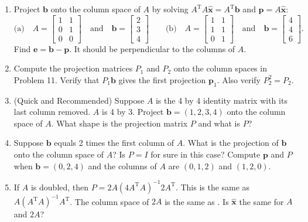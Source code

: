 \documentclass[14pt, a4paper]{article}
\begin{document}
\begin{enumerate}[resume]
    \item Project $\boldsymbol{b}$ onto the column space of $A$ by solving $A^{\mathrm{T}}A\widehat{\boldsymbol{x}} = A^{\mathrm{T}}\boldsymbol{b}$ and $\boldsymbol{p} = A\widehat{\boldsymbol{x}}$:
          \[
              \text{(a)} \quad A = \begin{bmatrix} 1 & 1 \\ 0 & 1 \\ 0 & 0 \end{bmatrix} \quad \text{and} \quad \boldsymbol{b} = \begin{bmatrix} 2 \\ 3 \\ 4 \end{bmatrix} \qquad
              \text{(b)} \quad A = \begin{bmatrix} 1 & 1 \\ 1 & 1 \\ 0 & 1 \end{bmatrix} \quad \text{and} \quad \boldsymbol{b} = \begin{bmatrix} 4 \\ 4 \\ 6 \end{bmatrix}.
          \]
          Find $\boldsymbol{e} = \boldsymbol{b} - \boldsymbol{p}$. It should be perpendicular to the columns of $A$.

    \item Compute the projection matrices $P_1$ and $P_2$ onto the column spaces in Problem 11. Verify that $P_1\boldsymbol{b}$ gives the first projection $\boldsymbol{p}_1$. Also verify $P_2^2 = P_2$.

    \item (Quick and Recommended) Suppose $A$ is the 4 by 4 identity matrix with its last column removed. $A$ is 4 by 3. Project $\boldsymbol{b} = (1, 2, 3, 4)$ onto the column space of $A$. What shape is the projection matrix $P$ and what is $P$?

    \item Suppose $\boldsymbol{b}$ equals 2 times the first column of $A$. What is the projection of $\boldsymbol{b}$ onto the column space of $A$? Is $P = I$ for sure in this case? Compute $\boldsymbol{p}$ and $P$ when $\boldsymbol{b} = (0, 2, 4)$ and the columns of $A$ are $(0, 1, 2)$ and $(1, 2, 0)$.

    \item If $A$ is doubled, then $P = 2A(4A^{\mathrm{T}}A)^{-1}2A^{\mathrm{T}}$. This is the same as $A(A^{\mathrm{T}}A)^{-1}A^{\mathrm{T}}$. The column space of $2A$ is the same as \underline{\hspace{2cm}}. Is $\widehat{\boldsymbol{x}}$ the same for $A$ and $2A$?


\end{enumerate}
\end{document}
